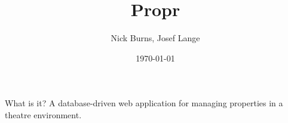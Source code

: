 \documentclass{beamer}
\title{Propr}
\author{Nick Burns, Josef Lange}
\institute{University of Puget Sound}
\date{\today}
\begin{document}
\begin{frame}
\titlepage
\end{frame}


\begin{frame}{What is it?}
A database-driven web application for managing properties in a theatre environment.
\end{frame}
\end{document}
